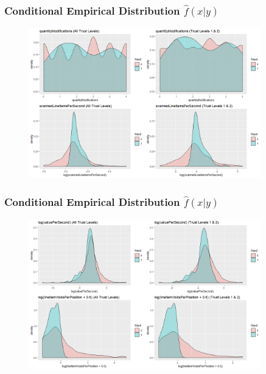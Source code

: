 \documentclass{beamer}
\begin{document}
\begin{frame}
\frametitle{Conditional Empirical Distribution $\hat{f}(x|y)$}
\begin{figure}[H]
		\centering
		\includegraphics[width = 0.9\textwidth]{figure/DATA_P3.png}
	\end{figure}
\end{frame}

\begin{frame}
\frametitle{Conditional Empirical Distribution $\hat{f}(x|y)$}
\begin{figure}[H]
		\centering
		\includegraphics[width = 0.9\textwidth]{figure/DATA_P4.png}
	\end{figure}
\end{frame}
\end{document}
